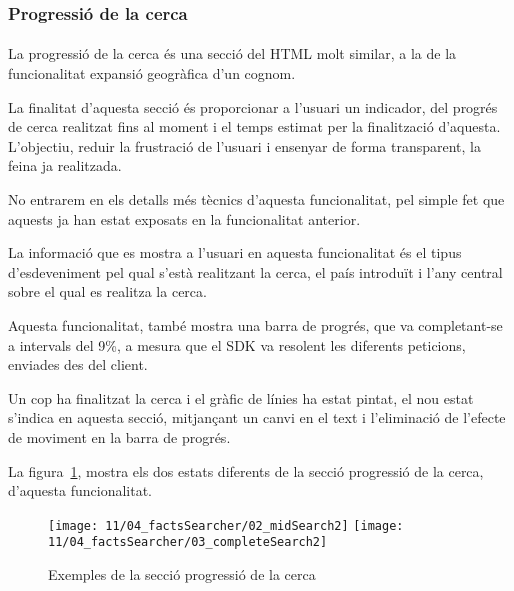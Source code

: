 \subsubsection{Progressió de la cerca}

\paragraph{}
La progressió de la cerca és una secció del HTML molt similar, a la de la funcio\-nalitat expansió geogràfica d’un cognom.

La finalitat d'aquesta secció és proporcionar a l'usuari un indicador, del progrés de cerca realitzat fins al moment i el temps estimat per la finalització d'aquesta. L'objectiu, reduir la frustració de l'usuari i ensenyar de forma transparent, la feina ja realitzada.

No entrarem en els detalls més tècnics d'aquesta funcionalitat, pel simple fet que aquests ja han estat exposats en la funcionalitat anterior.

La informació que es mostra a l'usuari en aquesta funcionalitat és el tipus d'es\-de\-ve\-ni\-ment pel qual s'està realitzant la cerca, el país introduït i l'any central sobre el qual es realitza la cerca.

Aquesta funcionalitat, també mostra una barra de progrés, que va completant-se a intervals del 9\%, a mesura que el SDK va resolent les diferents peticions, enviades des del client.

Un cop ha finalitzat la cerca i el gràfic de línies ha estat pintat, el nou estat s'indica en aquesta secció, mitjançant un canvi en el text i l’eliminació de l'efecte de moviment en la barra de progrés.

La figura~\ref{fig:waitingFacts}, mostra els dos estats diferents de la secció progressió de la cerca, d'aquesta funcionalitat.

\begin{figure}
    \texttt{[image: 11/04\_factsSearcher/02\_midSearch2]}
    \texttt{[image: 11/04\_factsSearcher/03\_completeSearch2]}
    \centering
    \caption{Exemples de la secció progressió de la cerca}\label{fig:waitingFacts}
\end{figure}
